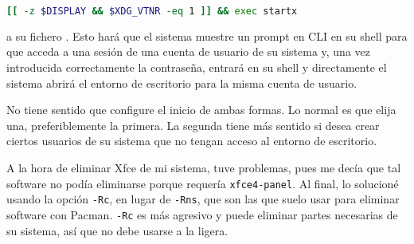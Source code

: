 \begin{enumerate}
    \begin{lstlisting}[gobble=2,language=bash,style=bashinteract,escapechar=!]
      [[ -z $DISPLAY && $XDG_VTNR -eq 1 ]] && exec startx
    \end{lstlisting}

    \noindent a su fichero . Esto hará que el sistema muestre un prompt en CLI en su
    shell para que acceda a una sesión de una cuenta de usuario de su sistema y, una vez introducida
    correctamente la contraseña, entrará en su shell y directamente el sistema abrirá el entorno de escritorio
    para la misma cuenta de usuario.

\end{enumerate}

\noindent No tiene sentido que configure el inicio de ambas formas. Lo normal es que elija una, preferiblemente
la primera. La segunda tiene más sentido si desea crear ciertos usuarios de su sistema que no tengan acceso al
entorno de escritorio.

A la hora de eliminar Xfce de mi sistema, tuve problemas, pues me decía que tal software no podía eliminarse
porque requería \lstinline!xfce4-panel!. Al final, lo solucioné usando la opción \lstinline!-Rc!, en lugar de
\lstinline!-Rns!, que son las que suelo usar para eliminar software con Pacman. \lstinline!-Rc! es más agresivo
y puede eliminar partes necesarias de su sistema, así que no debe usarse a la ligera.
